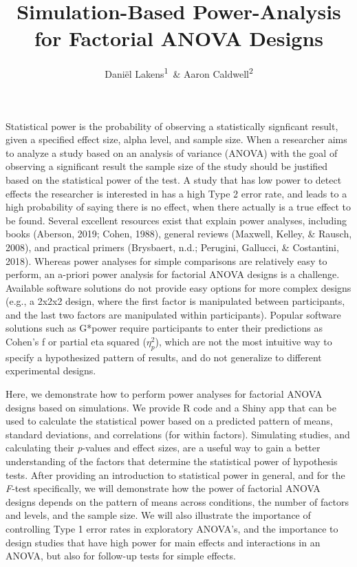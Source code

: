 \documentclass[,jou, draftfirst, a4paper,floatsintext]{apa6}
\title{Simulation-Based Power-Analysis for Factorial ANOVA Designs}
\author{Daniël Lakens\textsuperscript{1}~\& Aaron Caldwell\textsuperscript{2}}
\date{}
\affiliation{
\vspace{0.5cm}
\textsuperscript{1} Eindhoven University of Technology, The Netherlands\\\textsuperscript{2} Department of Health, Human Performance and Recreation, University of Arkansas, USA}
\begin{document}
\maketitle

Statistical power is the probability of observing a statistically signficant result, given a specified effect size, alpha level, and sample size.
When a researcher aims to analyze a study based on an analysis of variance (ANOVA) with the goal of observing a significant result the sample size of the study should be justified based on the statistical power of the test.
A study that has low power to detect effects the researcher is interested in has a high Type 2 error rate, and leads to a high probability of saying there is no effect, when there actually is a true effect to be found.
Several excellent resources exist that explain power analyses, including books (Aberson, 2019; Cohen, 1988), general reviews (Maxwell, Kelley, \& Rausch, 2008), and practical primers (Brysbaert, n.d.; Perugini, Gallucci, \& Costantini, 2018).
Whereas power analyses for simple comparisons are relatively easy to perform, an a-priori power analysis for factorial ANOVA designs is a challenge.
Available software solutions do not provide easy options for more complex designs (e.g., a 2x2x2 design, where the first factor is manipulated between participants, and the last two factors are manipulated within participants).
Popular software solutions such as G*power require participants to enter their predictions as Cohen's f or partial eta squared (\(\eta_p^2\)), which are not the most intuitive way to specify a hypothesized pattern of results, and do not generalize to different experimental designs.

Here, we demonstrate how to perform power analyses for factorial ANOVA designs based on simulations.
We provide R code and a Shiny app that can be used to calculate the statistical power based on a predicted pattern of means, standard deviations, and correlations (for within factors).
Simulating studies, and calculating their \emph{p}-values and effect sizes, are a useful way to gain a better understanding of the factors that determine the statistical power of hypothesis tests.
After providing an introduction to statistical power in general, and for the \emph{F}-test specifically, we will demonstrate how the power of factorial ANOVA designs depends on the pattern of means across conditions, the number of factors and levels, and the sample size.
We will also illustrate the importance of controlling Type 1 error rates in exploratory ANOVA's, and the importance to design studies that have high power for main effects and interactions in an ANOVA, but also for follow-up tests for simple effects.
\end{document}
